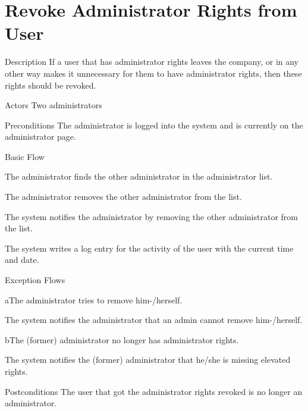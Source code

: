 \section{Revoke Administrator Rights from User}

%
\begin{cpart}{Description}
If a user that has administrator rights leaves the company, or in any other way makes it unnecessary for them to have administrator rights, then these rights should be revoked.
\end{cpart}


%
\begin{cpart}{Actors}
Two administrators
\end{cpart}

%
\begin{cpart}{Preconditions}
The administrator is logged into the system and is currently on the administrator page.
\end{cpart}

%
\begin{cpartList}{Basic Flow}
  \item The administrator finds the other administrator in the administrator list.
  \item The administrator removes the other administrator from the list.
  \item The system notifies the administrator by removing the other administrator from the list.
  \item The system writes a log entry for the activity of the user with the current time and date.
\end{cpartList}

%
\begin{cpartList}{Exception Flows}
  \begin{innerList}{2}{a}{The administrator tries to remove him-/herself.}
    \item The system notifies the administrator that an admin cannot remove him-/herself.
  \end{innerList}
  \begin{innerList}{2}{b}{The (former) administrator no longer has administrator rights.}
    \item The system notifies the (former) administrator that he/she is missing elevated rights.
  \end{innerList}
\end{cpartList}

%
\begin{cpart}{Postconditions}
The user that got the administrator rights revoked is no longer an administrator.
\end{cpart}

\clearpage
